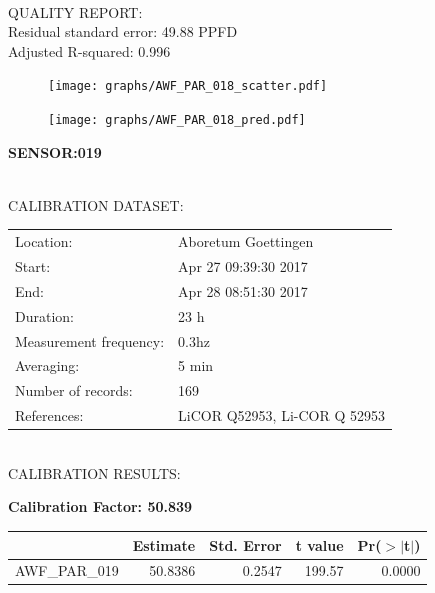 \documentclass[oneside]{report}
\begin{document}
\hrulefill\\
QUALITY REPORT:\\
Residual standard error: 49.88 PPFD\\
Adjusted R-squared: 0.996



\begin{figure}[H]
  \centering
  \texttt{[image: graphs/AWF\_PAR\_018\_scatter.pdf]}
\end{figure}




\begin{figure}[H]
  \centering
  \texttt{[image: graphs/AWF\_PAR\_018\_pred.pdf]}
\end{figure}

\pagebreak


\begin{center}
\large{\textbf{SENSOR:019}}\\
\end{center}

\hrulefill\\
CALIBRATION DATASET:\\
\begin{table}[h!]
  \centering
  \label{tab:table1}
  \begin{tabular}{ll}
    Location: & Aboretum Goettingen\\ 
    
    
    Start:  & Apr 27 09:39:30 2017 \\
    End:   & Apr 28 08:51:30 2017\\ 
    Duration: & 23 h\\
    Measurement frequency: & 0.3hz\\
    Averaging:  &5 min\\
    Number of records: & 169 \\
    References: & LiCOR Q52953, Li-COR Q 52953 \\
  \end{tabular}
\end{table}

\hrulefill\\
CALIBRATION RESULTS:\\


\begin{center}
\textbf{\large{Calibration Factor: 50.839}}\\
\end{center}
\begin{table}[ht]
\centering
\begin{tabular}{rrrrr}
  \hline
 & Estimate & Std. Error & t value & Pr($>$$|$t$|$) \\ 
  \hline
AWF\_PAR\_019 & 50.8386 & 0.2547 & 199.57 & 0.0000 \\ 
   \hline
\end{tabular}
\end{table}
\end{document}
